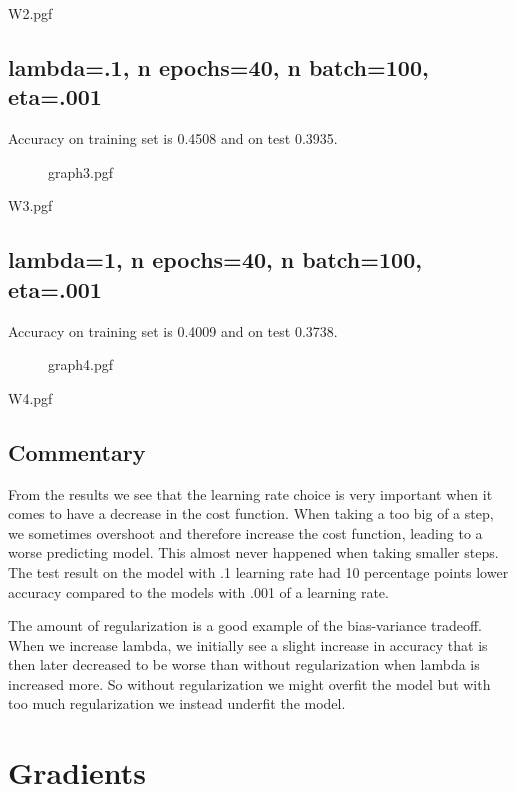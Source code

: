 \documentclass[12pt, a4paper]{article}
\begin{document}
\begin{adjustbox}{clip,trim=0cm 4cm 3cm 5cm}

    {W2.pgf}
\end{adjustbox}

\newpage

\subsection{lambda=.1, n epochs=40, n batch=100, eta=.001}
Accuracy on training set is 0.4508 and on test 0.3935.

\begin{figure}[h!]

    {graph3.pgf}
\end{figure}

\begin{adjustbox}{clip,trim=0cm 4cm 3cm 5cm}

    {W3.pgf}
\end{adjustbox}

\newpage

\subsection{lambda=1, n epochs=40, n batch=100, eta=.001}
Accuracy on training set is 0.4009 and on test 0.3738.


\begin{figure}[h!]

    {graph4.pgf}
\end{figure}

\begin{adjustbox}{clip,trim=0cm 4cm 3cm 5cm}

    {W4.pgf}
\end{adjustbox}
\newpage
\subsection{Commentary}
From the results we see that the learning rate choice is very important when it comes to have a decrease in the cost function. When taking a too big of a step, we sometimes overshoot and therefore increase the cost function, leading to a worse predicting model. This almost never happened when taking smaller steps.
The test result on the model with .1 learning rate had 10 percentage points lower accuracy compared to the models with .001 of a learning rate.

The amount of regularization is a good example of the bias-variance tradeoff. When we increase lambda, we initially see a slight increase in accuracy that is then later decreased to be worse than without regularization when lambda is increased more. So without regularization we might overfit the model but with too much regularization we instead underfit the model.

\newpage
\appendix
\section{Gradients}
\label{gradientData}
\end{document}
